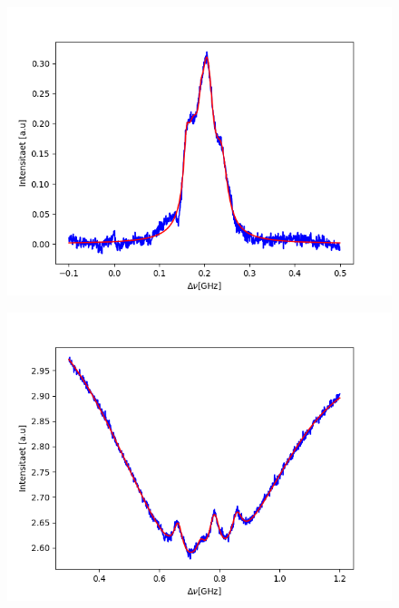 \documentclass[a4paper,parskip]{scrartcl}
\begin{document}
\begin{figure}[h]
\includegraphics[scale = 0.5]{./saturation/peak3/gaussCorrected.png}
\end{figure}

\begin{figure}[h]
\includegraphics[scale = 0.5]{./saturation/peak4/fit.png}
\end{figure}
\end{document}
